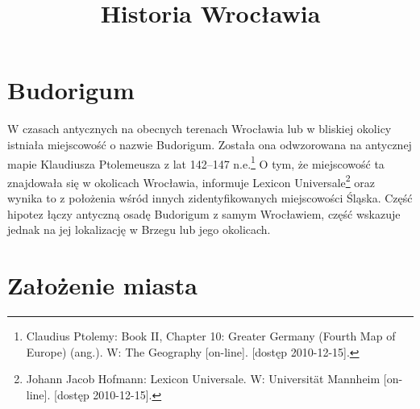 \documentclass[12pt]{article}
\title{\textbf{Historia Wrocławia}}
\date{}
\begin{document}
\maketitle

\tableofcontents

\section{Budorigum}

W czasach antycznych na obecnych terenach Wrocławia lub w bliskiej okolicy istniała miejscowość o nazwie Budorigum. Została ona odwzorowana na antycznej mapie Klaudiusza Ptolemeusza z lat 142–147 n.e.\footnote{Claudius Ptolemy: Book II, Chapter 10: Greater Germany (Fourth Map of Europe) (ang.). W: The Geography [on-line]. [dostęp 2010-12-15].} O tym, że miejscowość ta znajdowała się w okolicach Wrocławia, informuje Lexicon Universale\footnote{Johann Jacob Hofmann: Lexicon Universale. W: Universität Mannheim [on-line]. [dostęp 2010-12-15].} oraz wynika to z położenia wśród innych zidentyfikowanych miejscowości Śląska. Część hipotez łączy antyczną osadę Budorigum z samym Wrocławiem, część wskazuje jednak na jej lokalizację w Brzegu lub jego okolicach. 

\section{Założenie miasta}
\end{document}

